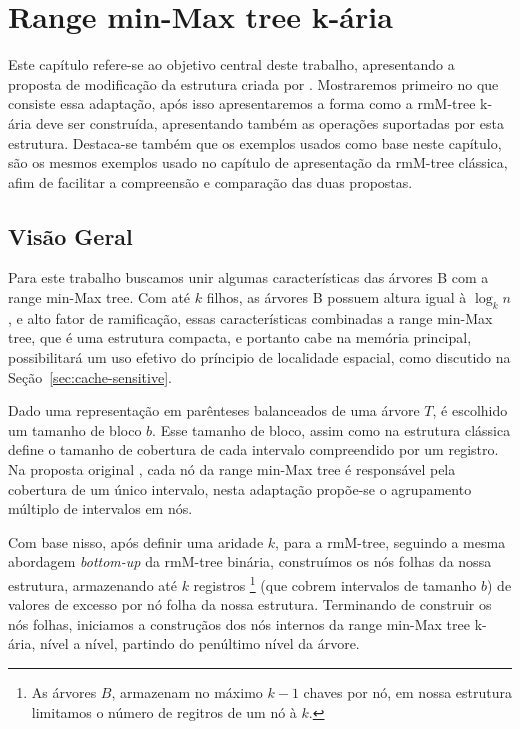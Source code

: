 \chapter{Range min-Max tree k-ária}
\label{chp:desenvolvimento}
Este capítulo refere-se ao objetivo central deste trabalho, apresentando a proposta de modificação da estrutura criada por \cite{paper-fully-functinal-succint-trees}. Mostraremos primeiro no que consiste essa adaptação, após isso apresentaremos a forma como a rmM-tree k-ária deve ser construída, apresentando também as operações suportadas por esta estrutura. 
Destaca-se também que os exemplos usados como base neste capítulo, são os mesmos exemplos usado no capítulo de apresentação da rmM-tree clássica, afim de facilitar a compreensão e comparação das duas propostas.

\section{Visão Geral}
Para este trabalho buscamos unir algumas características das árvores B com a range min-Max tree. Com até $k$ filhos, as árvores B possuem altura igual à $\log_k n$, e alto fator de ramificação, essas características combinadas a range min-Max tree, que é uma estrutura compacta, e portanto cabe na memória principal, possibilitará um uso efetivo do príncipio de localidade espacial, como discutido na Seção~\ref{sec:cache-sensitive}.

Dado uma representação em parênteses balanceados de uma árvore $T$, é escolhido um tamanho de bloco $b$. Esse tamanho de bloco, assim como na estrutura clássica define o tamanho de cobertura de cada intervalo compreendido por um registro.  Na proposta original \citet{paper-fully-functinal-succint-trees}, cada nó da range min-Max tree é responsável pela cobertura de um único intervalo, nesta adaptação propõe-se o agrupamento múltiplo de intervalos em nós.

Com base nisso, após definir uma aridade $k$, para a rmM-tree, seguindo a mesma abordagem \textit{bottom-up} da rmM-tree binária, construímos os nós folhas da nossa estrutura, armazenando até $k$ registros  \footnote{As árvores $B$, armazenam no máximo $k-1$ chaves por nó, em nossa estrutura limitamos o número de regitros de um nó à $k$.} (que cobrem intervalos de tamanho $b$) de valores de excesso por nó folha da nossa estrutura. Terminando de construir os nós folhas, iniciamos a construçãos dos nós internos da range min-Max tree k-ária, nível a nível, partindo do penúltimo nível da árvore. 

